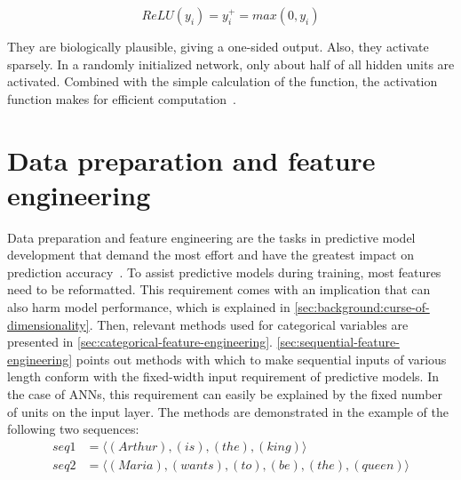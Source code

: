 $$ReLU(y_i) = y_i^+ = max(0, y_i)$$

They are biologically plausible, giving a one-sided output.
Also, they activate sparsely. In a randomly initialized network, only about half of all hidden units are activated.
Combined with the simple calculation of the function, the activation function makes for efficient computation~\cite{krizhevsky2012imagenet}.

\section{Data preparation and feature engineering}
\label{sec:background:feature-engineering}
Data preparation and feature engineering are the tasks in predictive model development that demand the most effort and have the greatest impact on prediction accuracy~\cite{kuhn2013applied}. To assist predictive models during training, most features need to be reformatted. This requirement comes with an implication that can also harm model performance, which is explained in \autoref{sec:background:curse-of-dimensionality}.
Then, relevant methods used for categorical variables are presented in \autoref{sec:categorical-feature-engineering}. \autoref{sec:sequential-feature-engineering} points out methods with which to make sequential inputs of various length conform with the fixed-width input requirement of predictive models. In the case of ANNs, this requirement can easily be explained by the fixed number of units on the input layer. The methods are demonstrated in the example of the following two sequences:
\begin{equation*}
    \begin{split}
        seq1 &= \langle(Arthur),(is),(the),(king)\rangle\\
        seq2 &= \langle(Maria),(wants),(to),(be),(the),(queen)\rangle
    \end{split}
\end{equation*}

